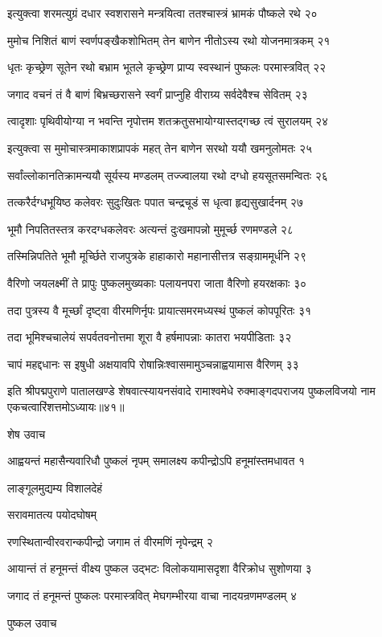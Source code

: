 इत्युक्त्वा शरमत्युग्रं दधार स्वशरासने
मन्त्रयित्वा ततश्चास्त्रं भ्रामकं पौष्कले रथे २०

मुमोच निशितं बाणं स्वर्णपङ्खैकशोभितम्
तेन बाणेन नीतोऽस्य रथो योजनमात्रकम् २१

धृतः कृच्छ्रेण सूतेन रथो बभ्राम भूतले
कृच्छ्रेण प्राप्य स्वस्थानं पुष्कलः परमास्त्रवित् २२

जगाद वचनं तं वै बाणं बिभ्रच्छरासने
स्वर्गं प्राप्नुहि वीराग्र्य सर्वदेवैश्च सेवितम् २३

त्वादृशाः पृथिवीयोग्या न भवन्ति नृपोत्तम
शतक्रतुसभायोग्यास्तद्गच्छ त्वं सुरालयम् २४

इत्युक्त्वा स मुमोचास्त्रमाकाशप्रापकं महत्
तेन बाणेन सरथो ययौ खमनुलोमतः २५

सर्वांल्लोकानतिक्रामन्ययौ सूर्यस्य मण्डलम्
तज्ज्वालया रथो दग्धो हयसूतसमन्वितः २६

तत्करैर्दग्धभूयिष्ठ कलेवरः सुदुःखितः
पपात चन्द्रचूडं स धृत्वा हृद्यसुखार्दनम् २७

भूमौ निपतितस्तत्र करदग्धकलेवरः
अत्यन्तं दुःखमापन्नो मुमूर्च्छ रणमण्डले २८

तस्मिन्निपतिते भूमौ मूर्च्छिते राजपुत्रके
हाहाकारो महानासीत्तत्र सङ्ग्राममूर्धनि २९

वैरिणो जयलक्ष्मीं ते प्रापुः पुष्कलमुख्यकाः
पलायनपरा जाता वैरिणो हयरक्षकाः ३०

तदा पुत्रस्य वै मूर्च्छां दृष्ट्वा वीरमणिर्नृपः
प्रायात्समरमध्यस्थं पुष्कलं कोपपूरितः ३१

तदा भूमिश्चचालेयं सपर्वतवनोत्तमा
शूरा वै हर्षमापन्नाः कातरा भयपीडिताः ३२

चापं महद्दधानः स इषुधी अक्षयावपि
रोषान्निःश्वासमामुञ्चन्नाह्वयामास वैरिणम् ३३

इति श्रीपद्मपुराणे पातालखण्डे शेषवात्स्यायनसंवादे रामाश्वमेधे रुक्माङ्गदपराजय पुष्कलविजयो नाम एकचत्वारिंशत्तमोऽध्यायः॥४१॥


शेष उवाच

आह्वयन्तं महासैन्यवारिधौ पुष्कलं नृपम्
समालक्ष्य कपीन्द्रोऽपि हनूमांस्तमधावत १

लाङ्गूलमुद्यम्य विशालदेहं

सरावमातत्य पयोदघोषम्

रणस्थितान्वीरवरान्कपीन्द्रो
जगाम तं वीरमणिं नृपेन्द्रम् २

आयान्तं तं हनूमन्तं वीक्ष्य पुष्कल उद्भटः
विलोकयामासदृशा वैरिक्रोध सुशोणया ३

जगाद तं हनूमन्तं पुष्कलः परमास्त्रवित्
मेघगम्भीरया वाचा नादयन्रणमण्डलम् ४

पुष्कल उवाच

